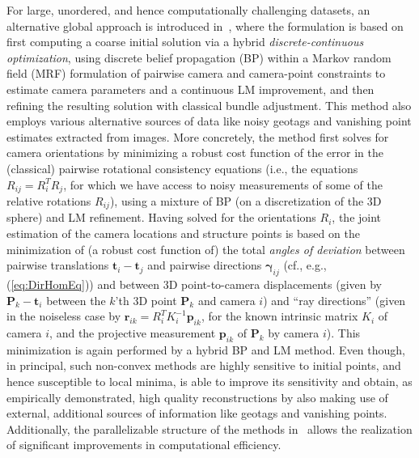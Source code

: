 \documentclass[10pt]{article}
\begin{document}
For large, unordered, and hence computationally challenging datasets, an alternative global approach is introduced in~\cite{SnavelyDISCO}, where the formulation is based on first computing a coarse initial solution via a hybrid \textit{discrete-continuous optimization}, using discrete belief propagation (BP) within a Markov random field (MRF) formulation of pairwise camera and camera-point constraints to estimate camera parameters and a continuous LM improvement, and then refining the resulting solution with classical bundle adjustment. This method also employs various alternative sources of data like noisy geotags and vanishing point estimates extracted from images. More concretely, the method first solves for camera orientations by minimizing a robust cost function of the error in the (classical) pairwise rotational consistency equations (i.e., the equations $R_{ij} = R_i^TR_j$, for which we have access to noisy measurements of some of the relative rotations $R_{ij}$), using a mixture of BP (on a discretization of the $3$D sphere) and LM refinement. Having solved for the orientations $R_i$, the joint estimation of the camera locations and structure points is based on the minimization of (a robust cost function of) the total \textit{angles of deviation} between pairwise translations $\mathbf{t}_i-\mathbf{t}_j$ and pairwise directions $\mathbf{\gamma}_{ij}$ (cf., e.g., (\ref{eq:DirHomEq})) and between $3$D point-to-camera displacements (given by $\mathbf{P}_k-\mathbf{t}_i$ between the $k$'th $3$D point $\mathbf{P}_k$ and camera $i$) and ``ray directions'' (given in the noiseless case by $\mathbf{r}_{ik} = R_i^TK_i^{-1}\mathbf{p}_{ik}$, for the known intrinsic matrix $K_i$ of camera $i$, and the projective measurement $\mathbf{p}_{ik}$ of $\mathbf{P}_k$ by camera $i$). This minimization is again performed by a hybrid BP and LM method. Even though, in principal, such non-convex methods are highly sensitive to initial points, and hence susceptible to local minima, \cite{SnavelyDISCO} is able to improve its sensitivity and obtain, as empirically demonstrated, high quality reconstructions by also making use of external, additional sources of information like geotags and vanishing points. Additionally, the parallelizable structure of the methods in~\cite{SnavelyDISCO} allows the realization of significant improvements in computational efficiency.
\end{document}
